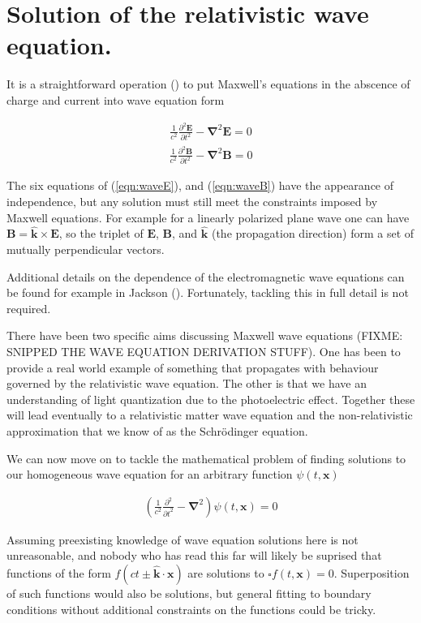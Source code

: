 \documentclass[]{eliblog}
\newcommand{\BB}[0]{\mathbf{B}}
\newcommand{\BE}[0]{\mathbf{E}}
\newcommand{\Bk}[0]{\mathbf{k}}
\newcommand{\Bx}[0]{\mathbf{x}}
\newcommand{\cross}[0]{\times}
\newcommand{\spacegrad}[0]{\boldsymbol{\nabla}}
\newcommand{\delambertian}[0]{\square}
\newcommand{\inv}[1]{\frac{1}{#1}}
\newcommand{\kcap}[0]{\hat{\Bk}}
\begin{document}
\section{Solution of the relativistic wave equation.}

It is a straightforward operation (\cite{fleisch2007ssg}) to put Maxwell's
equations in the abscence of charge and current into wave equation form

\begin{align}\label{eqn:waveE}
\inv{c^2} \frac{\partial^2 \BE}{\partial t^2} - \spacegrad^2 \BE = 0
\end{align}
\begin{align}\label{eqn:waveB}
\inv{c^2} \frac{\partial^2 \BB}{\partial t^2} - \spacegrad^2 \BB = 0
\end{align}

The six equations of (\ref{eqn:waveE}), and (\ref{eqn:waveB}) have the
appearance of independence, but
any solution must still meet the constraints imposed by Maxwell equations.
For example for a linearly polarized
plane wave one can have $\BB = \kcap \cross \BE$, so the triplet of $\BE$, $\BB$, and $\kcap$ (the propagation direction) form a set 
of mutually perpendicular vectors.

Additional details on the dependence of the electromagnetic wave equations
can be found for example in Jackson (\cite{jackson1975cewWave}).
Fortunately, tackling this in full detail is not required.  

There have been two specific aims discussing Maxwell wave equations (FIXME: SNIPPED THE WAVE EQUATION DERIVATION STUFF).
One has been to provide a real world example of something that propagates with behaviour
governed by the relativistic wave equation.  The other is that we have an understanding 
of light quantization due to the photoelectric effect.  Together these 
will lead eventually to a relativistic matter wave equation and
the non-relativistic approximation that we know of as the 
Schr\"{o}dinger equation.

We can now move on to tackle the mathematical problem of finding solutions to our 
homogeneous wave equation for an arbitrary function $\psi(t,\Bx)$

\begin{align}
\left( \frac{1}{c^2}\frac{\partial^2}{{\partial t}^2} - \spacegrad^2 \right) \psi(t,\Bx) = 0
\end{align}

Assuming preexisting knowledge of wave equation solutions here is not unreasonable, and nobody who has read this
far 
will likely be suprised that functions of the form $f(ct \pm \kcap \cdot \Bx)$
are solutions to $\delambertian f(t,\Bx) = 0$.  Superposition
of such functions would also be solutions, but general fitting to boundary conditions without additional constraints 
on the functions could be tricky.
\end{document}
